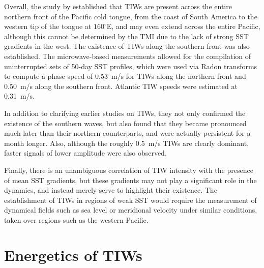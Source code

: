 \documentclass[letterpaper, 11pt, onecolumn]{article}
\newcommand{\degree}{^{\circ}} \newcommand{\abs}[1]{\lvert#1\rvert}
\begin{document}
Overall, the study by \citet{Chelton++:2000} established that TIWs are present
across the entire northern front of the Pacific cold tongue, from the coast of
South America to the western tip of the tongue at $160\degree\text{E}$, and may
even extend across the entire Pacific, although this cannot be determined by
the TMI due to the lack of strong SST gradients in the west. The existence of
TIWs along the southern front was also established. The microwave-based
measurements allowed for the compilation of uninterrupted sets of 50-day SST
profiles, which were used via Radon transforms to compute a phase speed of
0.53~m/s for TIWs along the northern front and 0.50~m/s along the southern
front. Atlantic TIW speeds were estimated at 0.31~m/s.

In addition to clarifying earlier studies on TIWs, they not only confirmed the
existence of the southern waves, but also found that they became pronounced
much later than their northern counterparts, and were actually persistent for a
month longer. Also, although the roughly 0.5~m/s TIWs are clearly dominant,
faster signals of lower amplitude were also observed.

Finally, there is an unambiguous correlation of TIW intensity with the presence
of mean SST gradients, but these gradients may not play a significant role in
the dynamics, and instead merely serve to highlight their existence. The
establishment of TIWs in regions of weak SST would require the measurement of
dynamical fields such as sea level or meridional velocity under similar
conditions, taken over regions such as the western Pacific.

\section{Energetics of TIWs}
\end{document}
